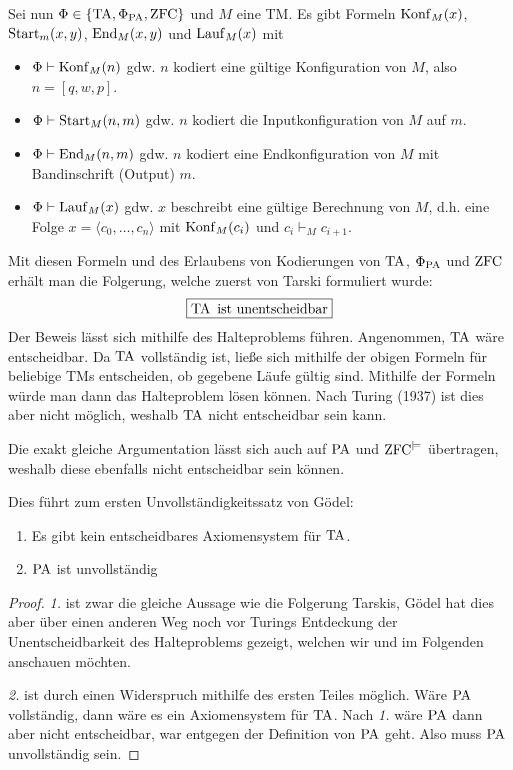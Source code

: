 Sei nun $\Phi\in\{\operatorname{TA},\Phi_{\operatorname{PA}},\operatorname{ZFC}\}$ und $M$ eine TM. Es gibt Formeln $\operatorname{Konf}_M(x)$, $\operatorname{Start}_m(x,y)$, $\operatorname{End}_M(x,y)$ und $\operatorname{Lauf}_M(x)$ mit 
\begin{itemize}
	\item $\Phi\vdash \operatorname{Konf}_M(n)$ gdw. $n$ kodiert eine gültige Konfiguration von $M$, also $n=[q,w,p]$.
	\item $\Phi\vdash \operatorname{Start}_M(n,m)$ gdw. $n$ kodiert die Inputkonfiguration von $M$ auf $m$.
	\item $\Phi\vdash \operatorname{End}_M(n,m)$ gdw. $n$ kodiert eine Endkonfiguration von $M$ mit Bandinschrift (Output) $m$.
	\item $\Phi\vdash \operatorname{Lauf}_M(x)$ gdw. $x$ beschreibt eine gültige Berechnung von $M$, d.h. eine Folge $x=\langle c_0,\dots,c_n\rangle$ mit $\operatorname{Konf}_M(c_i)$ und $c_i\vdash_M c_{i+1}$.
\end{itemize}

Mit diesen Formeln und des Erlaubens von Kodierungen von $\operatorname{TA}$, $\Phi_{\operatorname{PA}}$ und $\operatorname{ZFC}$ erhält man die Folgerung, welche zuerst von Tarski formuliert wurde:
$$\boxed{\operatorname{TA} \text{ ist unentscheidbar}}$$
Der Beweis lässt sich mithilfe des Halteproblems führen. Angenommen, $\operatorname{TA}$ wäre entscheidbar. Da $\operatorname{TA}$ vollständig ist, ließe sich mithilfe der obigen Formeln für beliebige TMs entscheiden, ob gegebene Läufe gültig sind. Mithilfe der Formeln würde man dann das Halteproblem lösen können. Nach Turing (1937) ist dies aber nicht möglich, weshalb $\operatorname{TA}$ nicht entscheidbar sein kann.

Die exakt gleiche Argumentation lässt sich auch auf $\operatorname{PA}$ und $\operatorname{ZFC}^{\models}$ übertragen, weshalb diese ebenfalls nicht entscheidbar sein können.

Dies führt zum ersten Unvollständigkeitssatz von Gödel:

\begin{satz}
	\begin{enumerate}
		\item Es gibt kein entscheidbares Axiomensystem für $\operatorname{TA}$.
		\item $\operatorname{PA}$ ist unvollständig
	\end{enumerate}
	\label{unvollst1}
\end{satz}
\begin{proof}
\textit{1.} ist zwar die gleiche Aussage wie die Folgerung Tarskis, Gödel hat dies aber über einen anderen Weg noch vor Turings Entdeckung der Unentscheidbarkeit des Halteproblems gezeigt, welchen wir und im Folgenden anschauen möchten.

\textit{2.} ist durch einen Widerspruch mithilfe des ersten Teiles möglich. Wäre $\operatorname{PA}$ vollständig, dann wäre es ein Axiomensystem für $\operatorname{TA}$. Nach \textit{1.} wäre $\operatorname{PA}$ dann aber nicht entscheidbar, war entgegen der Definition von $\operatorname{PA}$ geht. Also muss $\operatorname{PA}$ unvollständig sein.
\end{proof}


